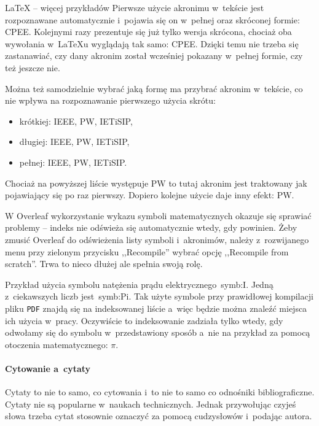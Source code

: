 \begin{easyappendix}{\LaTeX{} -- więcej przykładów}
Pierwsze użycie akronimu w~tekście jest rozpoznawane automatycznie i~pojawia się on w~pełnej oraz skróconej formie: \gls{CPEE}. Kolejnymi razy prezentuje się już tylko wersja skrócona, chociaż oba wywołania w~\LaTeX{u} wyglądają tak samo: \gls{CPEE}. Dzięki temu nie trzeba się zastanawiać, czy dany akronim został wcześniej pokazany w~pełnej formie, czy też jeszcze nie.

Można też samodzielnie wybrać jaką formę ma przybrać akronim w~tekście, co nie wpływa na rozpoznawanie pierwszego użycia skrótu:
\begin{itemize}
	\item krótkiej: \acrshort{IEEE}, \acrshort{PW}, \acrshort{IETiSIP},
	\item długiej: \acrlong{IEEE}, \acrlong{PW}, \acrlong{IETiSIP},
	\item pełnej: \acrfull{IEEE}, \acrfull{PW}, \acrfull{IETiSIP}.
\end{itemize}

Chociaż na powyższej liście występuje \gls{PW} to tutaj akronim jest traktowany jak pojawiający się po raz pierwszy. Dopiero kolejne użycie daje inny efekt: \gls{PW}.

W Overleaf wykorzystanie wykazu symboli matematycznych okazuje się sprawiać problemy -- indeks nie odświeża się automatycznie wtedy, gdy powinien. Żeby zmusić Overleaf do odświeżenia listy symboli i~akronimów, należy z~rozwijanego menu przy zielonym przycisku ,,Recompile'' wybrać opcję ,,Recompile from scratch''. Trwa to nieco dłużej ale spełnia swoją rolę.

Przykład użycia symbolu natężenia prądu elektrycznego~\gls{symb:I}. Jedną z~ciekawszych liczb jest~\gls{symb:Pi}. Tak użyte symbole przy prawidłowej kompilacji pliku \texttt{PDF} znajdą się na indeksowanej liście a~więc będzie można znaleźć miejsca ich użycia w~pracy. Oczywiście to indeksowanie zadziała tylko wtedy, gdy odwołamy się do symbolu w~przedstawiony sposób a~nie na przykład za pomocą otoczenia matematycznego: $\pi$.

\paragraph{Cytowanie a~cytaty}
Cytaty to nie to samo, co cytowania i~to nie to samo co odnośniki bibliograficzne. Cytaty nie są popularne w~naukach technicznych. Jednak przywołując czyjeś słowa trzeba cytat stosownie oznaczyć za pomocą cudzysłowów i~podając autora.


\end{easyappendix}
